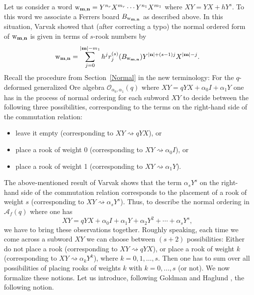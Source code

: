\documentclass[10pt]{amsart}
\begin{document}
Let us consider a word $\mathrm{w}_{{\bf m}, {\bf n}}=Y^{n_r}X^{m_r}\cdots Y^{n_1}X^{m_1}$ where $XY=YX+hY^s$. To this word we associate a Ferrers board $B_{\mathrm{w}_{{\bf m}, {\bf n}}}$ as described above. In this situation, Varvak \cite[Theorem 7.1]{AV2005} showed that (after correcting a typo) the normal ordered form of $\mathrm{w}_{{\bf m}, {\bf n}}$ is given in terms of $s$-rook numbers by
\begin{equation}\label{RookVarvak0}
\mathrm{w}_{{\bf m}, {\bf n}}=\sum_{j=0}^{|{\bf m}|-m_1} h^j r_j^{(s)}(B_{\mathrm{w}_{{\bf m}, {\bf n}}}) Y^{|{\bf n}|+(s-1)j}X^{|{\bf m}|-j}.
\end{equation}
Recall the procedure from Section~\ref{Normal} in the new terminology: For the $q$-deformed generalized Ore algebra ${\mathcal O}_{\alpha_0,\alpha_1}(q)$ where $XY=qYX+\alpha_0 I + \alpha_1 Y$ one has in the process of normal ordering for each subword $XY$ to decide between the following three possibilities, corresponding to the terms on the right-hand side of the commutation relation:
\begin{itemize}
\item leave it empty (corresponding to $XY \rightsquigarrow q YX$), or
\item place a rook of weight 0 (corresponding to $XY \rightsquigarrow \alpha_0 I$), or
\item place a rook of weight 1 (corresponding to $XY \rightsquigarrow \alpha_1 Y$).
\end{itemize}
The above-mentioned result of Varvak shows that the term $\alpha_s Y^s$ on the right-hand side of the commutation relation corresponds to the placement of a rook of weight $s$ (corresponding to $XY \rightsquigarrow \alpha_s Y^s$). Thus, to describe the normal ordering in $\mathcal{A}_{f}(q)$ where one has
\begin{equation}\label{WeylPoly}
XY=qYX+\alpha_0 I+ \alpha_1 Y+\alpha_2 Y^2+\cdots +\alpha_s Y^s,
\end{equation}
we have to bring these observations together. Roughly speaking, each time we come across a subword $XY$ we can choose between $(s+2)$ possibilities: Either do not place a rook (corresponding to $XY \rightsquigarrow q YX$), or place a rook of weight $k$ (corresponding to $XY \rightsquigarrow \alpha_k Y^k$), where $k=0,1,\ldots,s$. Then one has to sum over all possibilities of placing rooks of weights $k$ with $k=0,\ldots,s$ (or not). We now formalize these notions. Let us introduce, following Goldman and Haglund \cite{JGJH2000}, the following notion.
\end{document}
